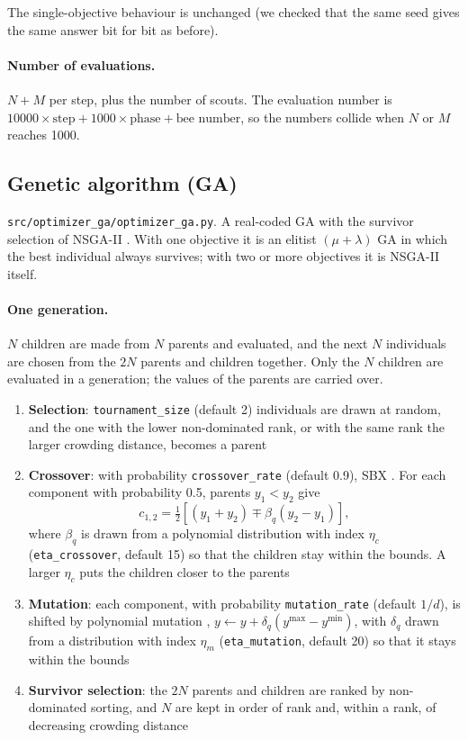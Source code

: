 \documentclass[11pt,a4paper]{article}
\begin{document}
The single-objective behaviour is unchanged (we checked that the same seed gives the same answer bit for bit as before).

\paragraph{Number of evaluations.} $N + M$ per step, plus the number of scouts. The evaluation number is $10000 \times \text{step} + 1000 \times \text{phase} + \text{bee number}$, so the numbers collide when $N$ or $M$ reaches 1000.

\subsection{Genetic algorithm (GA)}\label{sec:ga}

\texttt{src/optimizer\_ga/optimizer\_ga.py}. A real-coded GA with the survivor selection of NSGA-II \cite{deb2002}. With one objective it is an elitist $(\mu + \lambda)$ GA in which the best individual always survives; with two or more objectives it is NSGA-II itself.

\paragraph{One generation.} $N$ children are made from $N$ parents and evaluated, and the next $N$ individuals are chosen from the $2N$ parents and children together. Only the $N$ children are evaluated in a generation; the values of the parents are carried over.

\begin{enumerate}
\item \textbf{Selection}: \texttt{tournament\_size} (default 2) individuals are drawn at random, and the one with the lower non-dominated rank, or with the same rank the larger crowding distance, becomes a parent
\item \textbf{Crossover}: with probability \texttt{crossover\_rate} (default 0.9), SBX \cite{deb1995}. For each component with probability 0.5, parents $y_1 < y_2$ give
\begin{equation}
  c_{1,2} = \tfrac{1}{2}\left[ (y_1 + y_2) \mp \beta_q (y_2 - y_1) \right],
\end{equation}
where $\beta_q$ is drawn from a polynomial distribution with index $\eta_c$ (\texttt{eta\_crossover}, default 15) so that the children stay within the bounds. A larger $\eta_c$ puts the children closer to the parents
\item \textbf{Mutation}: each component, with probability \texttt{mutation\_rate} (default $1/d$), is shifted by polynomial mutation \cite{deb1996}, $y \leftarrow y + \delta_q (y^{\max} - y^{\min})$, with $\delta_q$ drawn from a distribution with index $\eta_m$ (\texttt{eta\_mutation}, default 20) so that it stays within the bounds
\item \textbf{Survivor selection}: the $2N$ parents and children are ranked by non-dominated sorting, and $N$ are kept in order of rank and, within a rank, of decreasing crowding distance
\end{enumerate}
\end{document}
